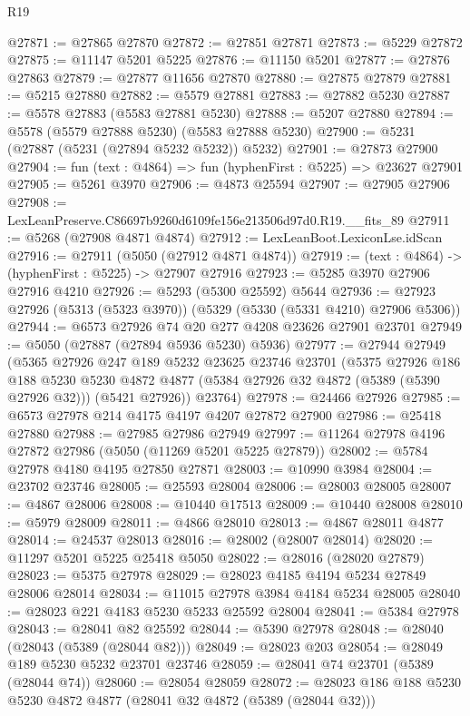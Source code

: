 \begin{lexlean}{R19}
\begin{coremodule}
@27871 := @27865 @27870
@27872 := @27851 @27871
@27873 := @5229 @27872
@27875 := @11147 @5201 @5225
@27876 := @11150 @5201
@27877 := @27876 @27863
@27879 := @27877 @11656 @27870
@27880 := @27875 @27879
@27881 := @5215 @27880
@27882 := @5579 @27881
@27883 := @27882 @5230
@27887 := @5578 @27883 (@5583 @27881 @5230)
@27888 := @5207 @27880
@27894 := @5578 (@5579 @27888 @5230) (@5583 @27888 @5230)
@27900 := @5231 (@27887 (@5231 (@27894 @5232 @5232)) @5232)
@27901 := @27873 @27900
@27904 := fun (text : @4864) => fun (hyphenFirst : @5225) => @23627 @27901
@27905 := @5261 @3970
@27906 := @4873 @25594
@27907 := @27905 @27906
@27908 := LexLeanPreserve.C86697b9260d6109fe156e213506d97d0.R19.__fits_89
@27911 := @5268 (@27908 @4871 @4874)
@27912 := LexLeanBoot.LexiconLse.idScan
@27916 := @27911 (@5050 (@27912 @4871 @4874))
@27919 := (text : @4864) -> (hyphenFirst : @5225) -> @27907 @27916
@27923 := @5285 @3970 @27906 @27916 @4210
@27926 := @5293 (@5300 @25592) @5644
@27936 := @27923 @27926 (@5313 (@5323 @3970)) (@5329 (@5330 (@5331 @4210) @27906 @5306))
@27944 := @6573 @27926 @74 @20 @277 @4208 @23626 @27901 @23701
@27949 := @5050 (@27887 (@27894 @5936 @5230) @5936)
@27977 := @27944
    @27949
    (@5365
      @27926
      @247
      @189
      @5232
      @23625
      @23746
      @23701
      (@5375
        @27926
        @186
        @188
        @5230
        @5230
        @4872
        @4877
        (@5384 @27926 @32 @4872 (@5389 (@5390 @27926 @32)))
        (@5421 @27926))
      @23764)
@27978 := @24466 @27926
@27985 := @6573 @27978 @214 @4175 @4197 @4207 @27872 @27900
@27986 := @25418 @27880
@27988 := @27985 @27986 @27949
@27997 := @11264 @27978 @4196 @27872 @27986 (@5050 (@11269 @5201 @5225 @27879))
@28002 := @5784 @27978 @4180 @4195 @27850 @27871
@28003 := @10990 @3984
@28004 := @23702 @23746
@28005 := @25593 @28004
@28006 := @28003 @28005
@28007 := @4867 @28006
@28008 := @10440 @17513
@28009 := @10440 @28008
@28010 := @5979 @28009
@28011 := @4866 @28010
@28013 := @4867 @28011 @4877
@28014 := @24537 @28013
@28016 := @28002 (@28007 @28014)
@28020 := @11297 @5201 @5225 @25418 @5050
@28022 := @28016 (@28020 @27879)
@28023 := @5375 @27978
@28029 := @28023 @4185 @4194 @5234 @27849 @28006 @28014
@28034 := @11015 @27978 @3984 @4184 @5234 @28005
@28040 := @28023 @221 @4183 @5230 @5233 @25592 @28004
@28041 := @5384 @27978
@28043 := @28041 @82 @25592
@28044 := @5390 @27978
@28048 := @28040 (@28043 (@5389 (@28044 @82)))
@28049 := @28023 @203
@28054 := @28049 @189 @5230 @5232 @23701 @23746
@28059 := @28041 @74 @23701 (@5389 (@28044 @74))
@28060 := @28054 @28059
@28072 := @28023 @186 @188 @5230 @5230 @4872 @4877 (@28041 @32 @4872 (@5389 (@28044 @32)))

\end{coremodule}
\end{lexlean}
